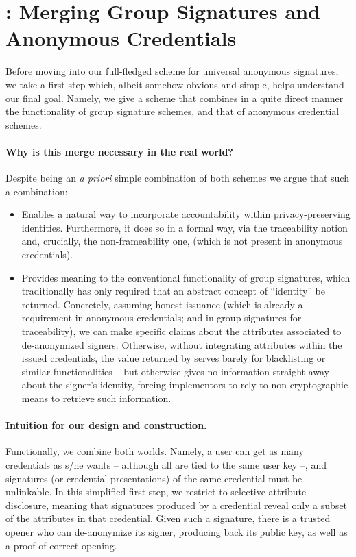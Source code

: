 \section{\GSAC: Merging Group Signatures and Anonymous
  Credentials}
\label{sec:gsac}

Before moving into our full-fledged scheme for universal anonymous signatures,
we take a first step which, albeit somehow obvious and simple, helps understand
our final goal. Namely, we give a scheme that combines in a quite direct manner
the functionality of group signature schemes, and that of anonymous credential
schemes.

\paragraph{Why is this merge necessary in the real world?} %
Despite being an \emph{a priori} simple combination of both schemes we argue
that such a combination:

\begin{itemize}
\item Enables a natural way to incorporate accountability within 
  privacy-preserving identities. Furthermore, it does so in a formal way,
  via the traceability notion and, crucially, the non-frameability one,
  (which is not present in anonymous credentials).
\item Provides meaning to the conventional \Open functionality of group
  signatures, which traditionally has only required that an abstract concept of
  ``identity'' be returned. Concretely, assuming honest issuance (which is
  already a requirement in anonymous credentials; and in group signatures for
  traceability), we can make specific claims about the attributes associated to
  de-anonymized signers. Otherwise, without integrating attributes within the
  issued credentials, the value returned by \Open serves barely for blacklisting
  or similar functionalities -- but otherwise gives no information straight away
  about the signer's identity, forcing implementors to rely to non-cryptographic
  means to retrieve such information.
\end{itemize}

\paragraph{Intuition for our design and construction.} %
Functionally, we combine both worlds. Namely, a user can get as many credentials
as s/he wants -- although all are tied to the same user key --, and signatures
(or credential presentations) of the same credential must be unlinkable. In this
simplified first step, we restrict to selective attribute disclosure, meaning
that signatures produced by a credential reveal only a subset of the attributes
in that credential. Given such a signature, there is a trusted opener who can
de-anonymize its signer, producing back its public key, as well as a proof of
correct opening.

